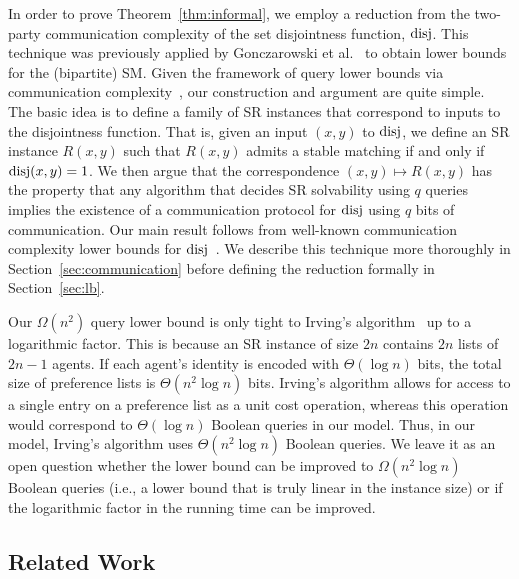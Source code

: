 In order to prove Theorem~\ref{thm:informal}, we employ a reduction from the two-party communication complexity of the set disjointness function, $\operatorname{disj}$. This technique was previously applied by Gonczarowski et al.~\cite{Gonczarowski2019-stable} to obtain lower bounds for the (bipartite) SM. Given the framework of query lower bounds via communication complexity~\cite{Blais2012-property,Eden2018-lower}, our construction and argument are quite simple. The basic idea is to define a family of SR instances that correspond to inputs to the disjointness function. That is, given an input $(x, y)$ to $\operatorname{disj}$, we define an SR instance $R(x, y)$ such that $R(x, y)$ admits a stable matching if and only if $\operatorname{disj}(x, y) = 1$. We then argue that the correspondence $(x, y) \mapsto R(x, y)$ has the property that any algorithm that decides SR solvability using $q$ queries implies the existence of a communication protocol for $\operatorname{disj}$ using $q$ bits of communication. Our main result follows from well-known communication complexity lower bounds for $\operatorname{disj}$~\cite{KS92,Razborov92}. We describe this technique more thoroughly in Section~\ref{sec:communication} before defining the reduction formally in Section~\ref{sec:lb}.

\begin{rem}
    Our $\Omega(n^2)$ query lower bound is only tight to Irving's algorithm~\cite{Irving1985-stable} up to a logarithmic factor. This is because an SR instance of size $2n$ contains $2n$ lists of $2n - 1$ agents. If each agent's identity is encoded with $\Theta(\log n)$ bits, the total size of preference lists is $\Theta(n^2 \log n)$ bits. Irving's algorithm allows for access to a single entry on a preference list as a unit cost operation, whereas this operation would correspond to $\Theta(\log n)$ Boolean queries in our model. Thus, in our model, Irving's algorithm uses $\Theta(n^2 \log n)$ Boolean queries. We leave it as an open question whether the lower bound can be improved to $\Omega(n^2 \log n)$ Boolean queries (i.e., a lower bound that is truly linear in the instance size) or if the logarithmic factor in the running time can be improved.
\end{rem}

\subsection{Related Work}

